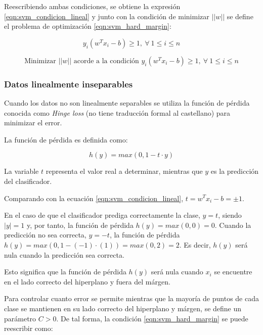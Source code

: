Reescribiendo ambas condiciones, se obtiene la expresión \ref{eqn:svm_condicion_lineal} y junto con la condición de minimizar $||w||$ se define el problema de optimización \ref{eqn:svm_hard_margin}:

\begin{equation}
	y_{i}\left(w^{T}x_{i}-b\right)\geq1,\: \forall\: 1\leq i\leq n
	\label{eqn:svm_condicion_lineal}
\end{equation}

\begin{equation}
	\mbox{Minimizar } ||w|| \mbox{ acorde a la condición } y_{i}\left(w^{T}x_{i}-b\right)\geq1,\: \forall\: 1\leq i\leq n
	\label{eqn:svm_hard_margin}
\end{equation}

\subsubsection{Datos linealmente inseparables}

Cuando los datos no son linealmente separables se utiliza la función de pérdida conocida como \textit{Hinge loss} (no tiene traducción formal al castellano) para minimizar el error.


La función de pérdida es definida como:

\begin{equation}
	h(y) = max\left(0,1-t\cdot y\right)
	\label{eqn:svm_hinge_loss}
\end{equation}

La variable $t$ representa el valor real a determinar, mientras que $y$ es la predicción del clasificador. 

Comparando con la ecuación \ref{eqn:svm_condicion_lineal}, $t = w^{T}x_{i}-b = \pm 1$.

En el caso de que el clasificador prediga correctamente la clase, $y = t$, siendo $|y| = 1$ y, por tanto, la función de pérdida $h(y) = max(0,0) = 0$. Cuando la predicción no sea correcta, $y = -t$, la función de pérdida $h(y) = max(0,1-(-1)\cdot(1)) = max(0,2) = 2$. Es decir, $h(y)$ será nula cuando la predicción sea correcta.

Esto significa que la función de pérdida $h(y)$ será nula cuando $x_{i}$ se encuentre en el lado correcto del hiperplano y fuera del márgen. 

Para controlar cuanto error se permite mientras que la mayoría de puntos de cada clase se mantienen en su lado correcto del hiperplano y márgen, se define un parámetro $C>0$. De tal forma, la condición \ref{eqn:svm_hard_margin} se puede reescribir como:

